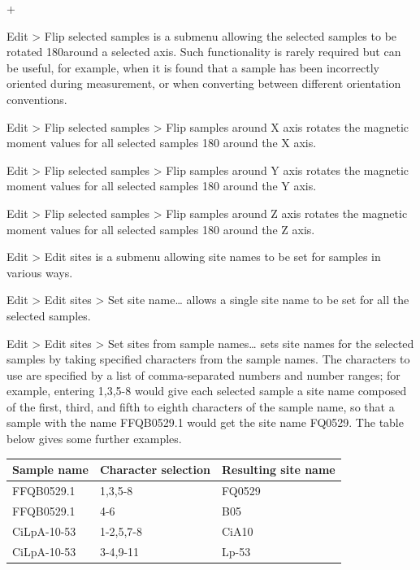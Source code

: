 \documentclass[a4paper,british]{article}
\newcommand{\menuitemlabel}[1]{%
\mbox{\textsf{#1}}\hfil}
\newenvironment{menuitemlist}%
{\begin{list}{}{%
\renewcommand{\makelabel}{\menuitemlabel}%
\setlength{\labelwidth}{35pt}%
\setlength{\leftmargin}%
             {\labelwidth+\labelsep}}}%
{\end{list}}
\newcommand{\ppcmd}[1]{\textsf{#1}} %
\newcommand{\submenu}{ \textgreater{} } %
\begin{document}
\begin{menuitemlist}
\item[Edit\submenu Flip selected samples] is a submenu allowing the selected
  samples to be rotated 180\textdegree around a selected axis. Such
  functionality is rarely required but can be useful, for example, when it is
  found that a sample has been incorrectly oriented during measurement, or
  when converting between different orientation conventions.

\item[Edit\submenu Flip selected samples\submenu Flip samples around X axis]
  rotates the magnetic moment values for all selected samples 180\textdegree
  around the X axis.

\item[Edit\submenu Flip selected samples\submenu Flip samples around Y axis]
  rotates the magnetic moment values for all selected samples 180\textdegree
  around the Y axis.

\item[Edit\submenu Flip selected samples\submenu Flip samples around Z axis]
  rotates the magnetic moment values for all selected samples 180\textdegree
  around the Z axis.

\item[Edit\submenu Edit sites] is a submenu allowing site names to be
  set for samples in various ways.

\item[Edit\submenu Edit sites\submenu Set site name\ldots] allows a single
  site name to be set for all the selected samples.

\item[Edit\submenu Edit sites\submenu Set sites from sample names\ldots] sets
  site names for the selected samples by taking specified characters from the
  sample names. The characters to use are specified by a list of
  comma-separated numbers and number ranges; for example, entering
  \ppcmd{1,3,5-8} would give each selected sample a site name composed of the
  first, third, and fifth to eighth characters of the sample name, so that
  a sample with the name \ppcmd{FFQB0529.1} would get the site name
  \ppcmd{FQ0529}. The table below gives some further examples.

\begin{tabular}{lll} \toprule
Sample name & Character selection & Resulting site name \\ \midrule
FFQB0529.1 & 1,3,5-8 & FQ0529 \\
FFQB0529.1 & 4-6 & B05 \\
CiLpA-10-53 & 1-2,5,7-8 & CiA10 \\
CiLpA-10-53 & 3-4,9-11 & Lp-53 \\
\bottomrule \end{tabular}


\end{menuitemlist}
\end{document}
